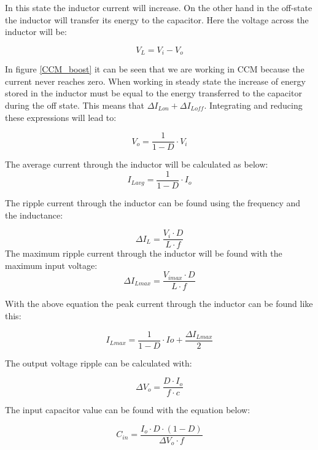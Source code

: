 In this state the inductor current will increase. On the other hand in the off-state the inductor will transfer its energy to the capacitor. Here the voltage across the inductor will be:

\begin{equation}
V_L = V_i-V_o
\end{equation}

In figure \ref{CCM_boost} it can be seen that we are working in CCM because the current never reaches zero. 
When working in steady state the increase of energy stored in the inductor must be equal to the energy transferred to the capacitor during the off state. This means that $\Delta I_{Lon}+\Delta I_{Loff}$. Integrating and reducing these expressions will lead to:

\begin{equation}
V_o = \frac{1}{1-D}\cdot V_i
\end{equation}
 
The average current through the inductor will be calculated as below:
\begin{equation}
I_{Lavg} = \frac{1}{1-D}\cdot I_o
\end{equation}

The ripple current through the inductor can be found using the frequency and the inductance:

\begin{equation}\label{boostind}
\Delta I_L = \frac{V_i\cdot D}{L\cdot f}
\end{equation}
The maximum ripple current through the inductor will be found with the maximum input voltage:
\begin{equation}
\Delta I_{Lmax} = \frac{V_{imax}\cdot D}{L\cdot f}
\end{equation}

With the above equation the peak current through the inductor can be found like this:

\begin{equation}
I_{Lmax} = \frac{1}{1-D}\cdot Io+\frac{\Delta I_{Lmax}}{2}
\end{equation}

 The output voltage ripple can be calculated with:

\begin{equation}\label{boostc}
\Delta V_o = \frac{D\cdot I_o}{f\cdot c}
\end{equation} \cite{boost_equation}

The input capacitor value can be found with the equation below:

\begin{equation}
\label{boostcin}
C_{in} = \frac{I_o\cdot D\cdot (1-D)}{\Delta V_o\cdot f}
\end{equation}  \cite{underthehood}
